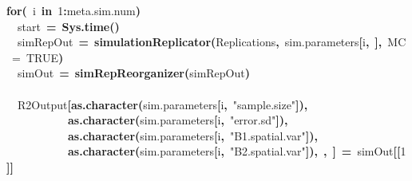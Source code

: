 \documentclass{article}
\makeatletter
\newcommand{\hlnumber}[1]{\textcolor[rgb]{0,0,0}{#1}}%
\newcommand{\hlfunctioncall}[1]{\textcolor[rgb]{0.501960784313725,0,0.329411764705882}{\textbf{#1}}}%
\newcommand{\hlstring}[1]{\textcolor[rgb]{0.6,0.6,1}{#1}}%
\newcommand{\hlkeyword}[1]{\textcolor[rgb]{0,0,0}{\textbf{#1}}}%
\newcommand{\hlargument}[1]{\textcolor[rgb]{0.690196078431373,0.250980392156863,0.0196078431372549}{#1}}%
\newcommand{\hlassignement}[1]{\textcolor[rgb]{0,0,0}{\textbf{#1}}}%
\newcommand{\hlsymbol}[1]{\textcolor[rgb]{0,0,0}{#1}}%
\newcommand{\hlstd}[1]{\textcolor[rgb]{0,0,0}{#1}}%
\newenvironment{kframe}{%
 \def\FrameCommand##1{\hskip\@totalleftmargin \hskip-\fboxsep
 \colorbox{shadecolor}{##1}\hskip-\fboxsep
     \hskip-\linewidth \hskip-\@totalleftmargin \hskip\columnwidth}%
 \MakeFramed {\advance\hsize-\width
   \@totalleftmargin\z@ \linewidth\hsize
   \@setminipage}}%
 {\par\unskip\endMakeFramed}
\newenvironment{knitrout}{}{} %
\makeatother
\begin{document}
\begin{knitrout}
\begin{kframe}
\begin{flushleft}
\hlstd{}\hlkeyword{for}\hlkeyword{(}{\ }\hlsymbol{i}{\ }\hlkeyword{in}{\ }\hlnumber{1}\hlkeyword{:}\hlsymbol{meta.sim.num}\hlkeyword{)}{\ }\hlkeyword{\usebox{\hlnormalsizeboxopenbrace}}\hspace*{\fill}\\
\hlstd{}{\ }{\ }\hlsymbol{start}{\ }\hlassignement{=}{\ }\hlfunctioncall{Sys.time}\hlkeyword{(}\hlkeyword{)}\hspace*{\fill}\\
\hlstd{}{\ }{\ }\hlsymbol{simRepOut}{\ }\hlassignement{=}{\ }\hlfunctioncall{simulationReplicator}\hlkeyword{(}\hlsymbol{Replications}\hlkeyword{,}{\ }\hlsymbol{sim.parameters}\hlkeyword{[}\hlsymbol{i}\hlkeyword{,}{\ }\hlkeyword{]}\hlkeyword{,}{\ }\hlargument{MC}{\ }\hlargument{=}{\ }\hlnumber{TRUE}\hlkeyword{)}\hspace*{\fill}\\
\hlstd{}{\ }{\ }\hlsymbol{simOut}{\ }\hlassignement{=}{\ }\hlfunctioncall{simRepReorganizer}\hlkeyword{(}\hlsymbol{simRepOut}\hlkeyword{)}\hspace*{\fill}\\
\hlstd{}\hspace*{\fill}\\
\hlstd{}{\ }{\ }\hlsymbol{R2Output}\hlkeyword{[}\hlfunctioncall{as.character}\hlkeyword{(}\hlsymbol{sim.parameters}\hlkeyword{[}\hlsymbol{i}\hlkeyword{,}{\ }\hlstring{"{}sample.size"{}}\hlkeyword{]}\hlkeyword{)}\hlkeyword{,}\hspace*{\fill}\\
\hlstd{}{\ }{\ }{\ }{\ }{\ }{\ }{\ }{\ }{\ }{\ }{\ }\hlfunctioncall{as.character}\hlkeyword{(}\hlsymbol{sim.parameters}\hlkeyword{[}\hlsymbol{i}\hlkeyword{,}{\ }\hlstring{"{}error.sd"{}}\hlkeyword{]}\hlkeyword{)}\hlkeyword{,}\hspace*{\fill}\\
\hlstd{}{\ }{\ }{\ }{\ }{\ }{\ }{\ }{\ }{\ }{\ }{\ }\hlfunctioncall{as.character}\hlkeyword{(}\hlsymbol{sim.parameters}\hlkeyword{[}\hlsymbol{i}\hlkeyword{,}{\ }\hlstring{"{}B1.spatial.var"{}}\hlkeyword{]}\hlkeyword{)}\hlkeyword{,}\hspace*{\fill}\\
\hlstd{}{\ }{\ }{\ }{\ }{\ }{\ }{\ }{\ }{\ }{\ }{\ }\hlfunctioncall{as.character}\hlkeyword{(}\hlsymbol{sim.parameters}\hlkeyword{[}\hlsymbol{i}\hlkeyword{,}{\ }\hlstring{"{}B2.spatial.var"{}}\hlkeyword{]}\hlkeyword{)}\hlkeyword{,}{\ }\hlkeyword{,}{\ }\hlkeyword{]}{\ }\hlassignement{=}{\ }\hlsymbol{simOut}\hlkeyword{[[}\hlnumber{1}\hlkeyword{]}\hlkeyword{]}\hspace*{\fill}\\

\end{flushleft}
\end{kframe}
\end{knitrout}
\end{document}
